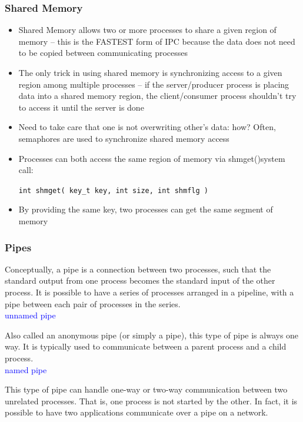 \documentclass{article}
\begin{document}
\subsubsection{Shared Memory}
\begin{itemize}
    \item  Shared Memory allows two or more processes to share a given region of memory – this is the FASTEST form of IPC because the data does not need to be copied between communicating processes
    \item The only trick in using shared memory is synchronizing access to a given region among multiple processes – if the server/producer process is placing data into a shared memory region, the client/consumer process shouldn't try to access it until the server is done
    
    \item Need to take care that one is not overwriting other's data: how? Often, semaphores are used to synchronize shared memory access
    
    \item Processes can both access the same region of memory via shmget()system call: 
    
    \texttt{int shmget( key\_t key, int size, int shmflg )}
    \item By providing the same key, two processes can get the same segment of memory
\end{itemize}

\subsubsection{Pipes}
Conceptually, a pipe is a connection between two processes, such that the standard output from one process becomes the standard input of the other process. It is possible to have a series of processes arranged in a pipeline, with a pipe between each pair of processes in the series.\\

\textcolor{blue}{unnamed pipe}

Also called an anonymous pipe (or simply a pipe), this type of pipe is always one way. It is typically used to communicate between a parent process and a child process.\\

\textcolor{blue}{named pipe}

This type of pipe can handle one-way or two-way communication between two unrelated processes. That is, one process is not started by the other. In fact, it is possible to have two applications communicate over a pipe on a network. 
\end{document}
